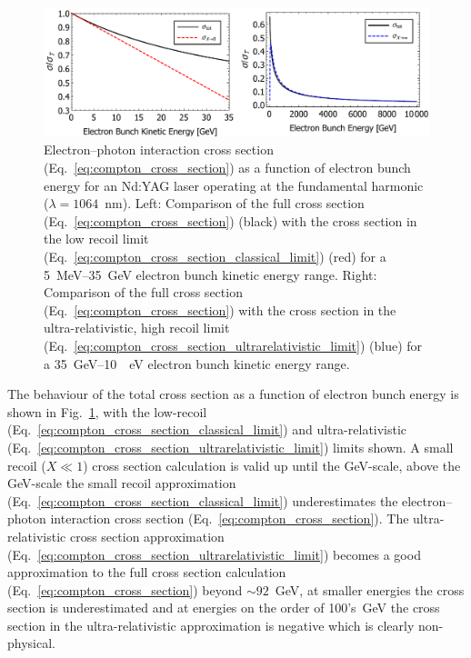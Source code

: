 \documentclass[../main.tex]{subfiles}
\begin{document}
\begin{figure}[!h]
\centering
\includegraphics[width=\textwidth]{Figures/Photon_Production_by_Inverse_Compton_Scattering/Cross_Section_Electron_Bunch_Energy_NDYAG.pdf}
\caption{Electron--photon interaction cross section (Eq.~\ref{eq:compton_cross_section}) as a function of electron bunch energy for an Nd:YAG laser operating at the fundamental harmonic ($\lambda = 1064$~\si{\nano\meter}). Left: Comparison of the full cross section (Eq.~\ref{eq:compton_cross_section}) (black) with the cross section in the low recoil limit (Eq.~\ref{eq:compton_cross_section_classical_limit}) (red) for a 5~\si{\mega\electronvolt}--35~\si{\giga\electronvolt} electron bunch kinetic energy range. Right: Comparison of the full cross section (Eq.~\ref{eq:compton_cross_section}) with the cross section in the ultra-relativistic, high recoil limit (Eq.~\ref{eq:compton_cross_section_ultrarelativistic_limit}) (blue) for a 35~\si{\giga\electronvolt}--10~\si{\terra\electronvolt} electron bunch kinetic energy range.}
\label{fig:cross_section_electron_energy}
\end{figure}
The behaviour of the total cross section as a function of electron bunch energy is shown in Fig.~\ref{fig:cross_section_electron_energy}, with the low-recoil (Eq.~\ref{eq:compton_cross_section_classical_limit}) and ultra-relativistic (Eq.~\ref{eq:compton_cross_section_ultrarelativistic_limit}) limits shown. A small recoil ($X \ll 1$) cross section calculation is valid up until the \si{\giga\electronvolt}-scale, above the \si{\giga\electronvolt}-scale the small recoil approximation (Eq.~\ref{eq:compton_cross_section_classical_limit}) underestimates the electron--photon interaction cross section (Eq.~\ref{eq:compton_cross_section}). The ultra-relativistic cross section approximation (Eq.~\ref{eq:compton_cross_section_ultrarelativistic_limit}) becomes a good approximation to the full cross section calculation (Eq.~\ref{eq:compton_cross_section}) beyond  $\sim92$~\si{\giga\electronvolt}, at smaller energies the cross section is underestimated and at energies on the order of 100's~\si{\giga\electronvolt} the cross section in the ultra-relativistic approximation is negative which is clearly non-physical.     
\end{document}

